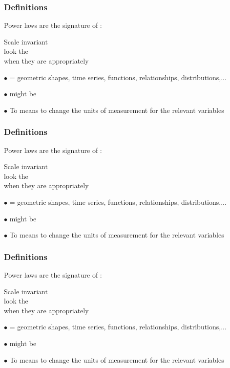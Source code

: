 \begin{frame}
  \frametitle{Definitions}

Power laws are the signature of :

Scale invariant \\
look the \\ 
when they are 
appropriately 

\inv
{\small $\bullet$  = geometric shapes, time series, functions, relationships, distributions,...}

{\small $\bullet$  might be }

{\small $\bullet$ To  means to change the units
of measurement for the relevant variables}

\end{frame}

\begin{frame}
  \frametitle{Definitions}

Power laws are the signature of :

Scale invariant \\
look the \\ 
when they are 
appropriately 

{\small $\bullet$  = geometric shapes, time series, functions, relationships, distributions,...}

\inv
{\small $\bullet$  might be }

{\small $\bullet$ To  means to change the units
of measurement for the relevant variables}

\end{frame}

\begin{frame}
  \frametitle{Definitions}

Power laws are the signature of :

Scale invariant \\
look the \\ 
when they are 
appropriately 

{\small $\bullet$  = geometric shapes, time series, functions, relationships, distributions,...}

{\small $\bullet$  might be }

\inv
{\small $\bullet$ To  means to change the units
of measurement for the relevant variables}

\end{frame}

